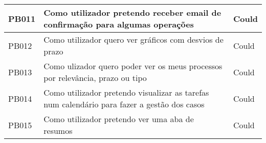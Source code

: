\begin{center}
\begin{tabular}{ | m{6em} | m{10cm}| m{2cm} | }
                            	\hline
                            PB011 & Como utilizador pretendo receber email de confirmação para algumas operações & Could\\
						        \hline
                            PB012 & Como utilizador quero ver gráficos com desvios de prazo & Could\\
                            	\hline	
					        PB013 & Como ulizador quero poder ver os meus processos por relevância, prazo ou tipo  & Could\\
                            	\hline
                            PB014 & Como utilizador pretendo visualizar as tarefas num calendário para fazer a gestão dos casos & Could \\
                                \hline
                            PB015 & Como utilizador pretendo ver uma aba de resumos & Could \\
                                \hline
					\end{tabular}
					\end{center}
	

		
